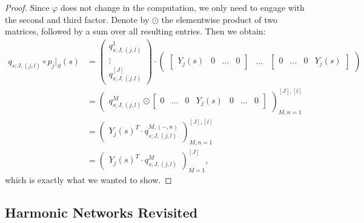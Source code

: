 \documentclass[12pt, a4paper]{article}
\theoremstyle{plain}
\theoremstyle{definition}
\theoremstyle{remark}
\begin{document}
\begin{proof}
Since $\varphi$ does not change in the computation, we only need to engage with the second and third factor. Denote by $\odot$ the elementwise product of two matrices, followed by a sum over all resulting entries. Then we obtain:
\begin{align*}
q_{s;J,(j,l)} \circ p_j|_S(s) & = 
\begin{pmatrix}
q_{s;J,(j,l)}^1 \\
\vdots \\
q_{s;J,(j,l)}^{[J]}
\end{pmatrix} \cdot  \begin{pmatrix}
\begin{bmatrix}
Y_j(s) & 0 & \hdots & 0
\end{bmatrix}
&
\hdots
&
\begin{bmatrix}
0 & \hdots & 0 & Y_j(s)
\end{bmatrix}
\end{pmatrix}\\
& = 
\begin{pmatrix}
q_{s;J,(j,l)}^{M} \odot \begin{bmatrix}0 & \hdots & 0 & Y_j(s) & 0 & \hdots & 0 \end{bmatrix}
\end{pmatrix}_{M, n = 1}^{[J], [l]} \\
& = \begin{pmatrix}
Y_j(s)^T \cdot q_{s;J,(j,l)}^{M, (-,n)}
\end{pmatrix}_{M, n = 1}^{[J], [l]} \\
& = \begin{pmatrix}
Y_j(s)^T \cdot q_{s;J,(j,l)}^{M}
\end{pmatrix}_{M=1}^{[J]},
\end{align*}
which is exactly what we wanted to show.
\end{proof}

\subsection{Harmonic Networks Revisited}
\end{document}
